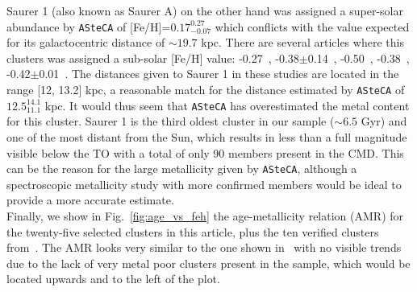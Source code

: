 \documentclass[draft]{aa}
\begin{document}
  Saurer 1 (also known as Saurer A) on the other hand was assigned a super-solar
  abundance by \texttt{ASteCA} of [Fe/H]=$0.17_{-0.07}^{0.27}$ which conflicts
  with the value expected for its galactocentric distance of $\sim19.7$ kpc.
  There are several articles where this clusters was assigned a sub-solar [Fe/H]
  value: -0.27~\citep{Carraro_2003}, -0.38$\pm$0.14~\citep{Carraro_2004},
  -0.50~\citep{Frinchaboy_2004b}, -0.38~\citep{Frinchaboy_2006},
  -0.42$\pm$0.01~\citep{Donor_2020}. The distances given to Saurer 1 in these
  studies are located in the range [12, 13.2] kpc, a reasonable match
  for the distance estimated by \texttt{ASteCA} of $12.5_{11.1}^{14.1}$ kpc. It
  would thus seem that \texttt{ASteCA} has overestimated the metal content for
  this cluster. Saurer 1 is the third oldest cluster in our sample ($\sim6.5$
  Gyr) and one of the most distant from the Sun, which results in less than a
  full magnitude visible below the TO with a total of only 90 members present in
  the CMD. This can be the reason for the large metallicity given by 
  \texttt{ASteCA}, although a spectroscopic metallicity study with more
  confirmed members would be ideal to provide a more accurate estimate.\\


  Finally, we show in Fig.~\ref{fig:age_vs_feh} the age-metallicity relation 
  (AMR) for the twenty-five selected clusters in this article, plus the ten
  verified clusters from~\cite{Perren_2020}. The AMR looks very similar to the
  one shown in~\citet[][their Fig. 4]{Salaris_2004} with no visible trends due
  to the lack of very metal poor clusters present in the sample, which would be
  located upwards and to the left of the plot.
\end{document}
